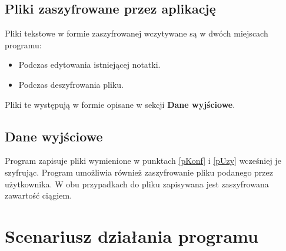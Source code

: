 \documentclass[a4paper]{article}
\begin{document}
\subsection{Pliki zaszyfrowane przez aplikację}
Pliki tekstowe w formie zaszyfrowanej wczytywane są w dwóch miejscach programu:
\begin{itemize}
    \item Podczas edytowania istniejącej notatki.
    \item Podczas deszyfrowania pliku.
\end{itemize}
Pliki te występują w formie opisane w sekcji \textbf{Dane wyjściowe}.

\subsection{Dane wyjściowe}
Program zapisuje pliki wymienione w punktach \ref{pKonf} i \ref{pUzy} wcześniej je szyfrując. Program umożliwia również zaszyfrowanie pliku podanego przez użytkownika. W obu przypadkach do pliku zapisywana jest zaszyfrowana zawartość ciągiem.

\newpage

\section{Scenariusz działania programu}
\end{document}
